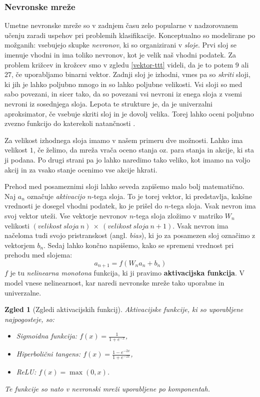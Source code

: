 \documentclass[12pt,a4paper]{amsart}
\theoremstyle{definition} %
\theoremstyle{plain} %
\newtheorem{zgled}[definicija]{Zgled}
\begin{document}
\subsubsection{Nevronske mreže}
Umetne nevronske mreže so v zadnjem času zelo popularne v nadzorovanem učenju zaradi uspehov pri 
problemih klasifikacije. Konceptualno so modelirane po možganih: vsebujejo skupke \textit{nevronov}, 
ki so organizirani v \textit{sloje}. Prvi sloj se imenuje vhodni in ima toliko nevronov, kot je velik 
naš vhodni podatek. Za problem križcev in krožcev smo v zgledu \ref{vektor-ttt} videli, da je to potem 
$9$ ali $27$, če uporabljamo binarni vektor. Zadnji sloj je izhodni, vmes pa so \textit{skriti} sloji, 
ki jih je lahko poljubno mnogo in so lahko poljubne velikosti. Vsi sloji so med sabo povezani, in sicer 
tako, da so povezani vsi nevroni iz enega sloja z vsemi nevroni iz sosednjega sloja. Lepota te strukture
je, da je univerzalni aproksimator, če vsebuje skriti sloj in je dovolj velika. Torej lahko oceni 
poljubno zvezno funkcijo do katerekoli natančnosti \cite{NN}.

Za velikost izhodnega sloja imamo v našem primeru dve možnosti. Lahko ima velikost $1$, če želimo, 
da mreža vrača oceno stanja oz. para stanja in akcije, ki sta ji podana. Po drugi strani pa jo lahko 
naredimo tako veliko, kot imamo na voljo akcij in za vsako stanje ocenimo vse akcije hkrati. 

Prehod med posameznimi sloji lahko seveda zapišemo malo bolj matematično. Naj $a_n$ označuje 
\textit{aktivacijo} $n$-tega sloja. To je torej vektor, ki predstavlja, kakšne vrednosti je dosegel
vhodni podatek, ko je prišel do $n$-tega sloja. Vsak nevron ima svoj vektor uteži. Vse vektorje nevronov 
$n$-tega sloja zložimo v matriko $W_n$ velikosti $(velikost~sloja~n)~\times~(velikost~sloja~n + 1)$. Vsak 
nevron ima načeloma tudi svojo pristranskost (angl. \textit{bias}), ki jo za posamezen sloj označimo z 
vektorjem $b_n$. Sedaj lahko končno napišemo, kako se spremeni vrednost pri prehodu med slojema:
$$
a_{n+1} = f(W_n a_n + b_n)
$$
$f$ je tu \textit{nelinearna monotona} funkcija, ki ji pravimo \textbf{aktivacijska funkcija}. V model 
vnese nelinearnost, kar naredi nevronske mreže tako uporabne in univerzalne. 

\begin{zgled}[Zgledi aktivacijskih funkcij]
    Aktivacijske funkcije, ki so uporabljene najpogosteje, so:
    \begin{itemize}
        \item Sigmoidna funkcija: $f(x) = \frac{1}{1 + e^{-x}}$, 
        \item Hiperbolični tangens: $f(x) = \frac{1 - e^{-2x}}{1 + e^{-2x}}$,
        \item ReLU: $f(x) = \max(0, x)$.
    \end{itemize}
    Te funkcije so nato v nevronski mreži uporabljene po komponentah.
\end{zgled}
\end{document}
